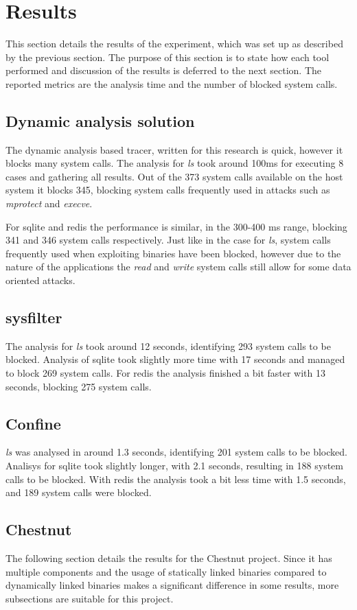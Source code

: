 \section{Results}
This section details the results of the experiment, which was set up as described by the previous section.
The purpose of this section is to state how each tool performed and discussion of the results is deferred to the next section.
The reported metrics are the analysis time and the number of blocked system calls.

\subsection {Dynamic analysis solution}
The dynamic analysis based tracer, written for this research is quick, however it blocks many system calls.
The analysis for \textit{ls} took around 100ms for executing 8 cases and gathering all results.
Out of the 373 system calls available on the host system it blocks 345, blocking system calls frequently used in attacks such as \textit{mprotect} and \textit{execve}.

For sqlite and redis the performance is similar, in the 300-400 ms range, blocking 341 and 346 system calls respectively. Just like in the case for \textit{ls}, system calls frequently used when exploiting binaries have been blocked, however due to the nature of the applications the \textit{read} and \textit{write} system calls still allow for some data oriented attacks.

\subsection {sysfilter}
The analysis for \textit{ls} took around 12 seconds, identifying 293 system calls to be blocked.
Analysis of sqlite took slightly more time with 17 seconds and managed to block 269 system calls.
For redis the analysis finished a bit faster with 13 seconds, blocking 275 system calls.

\subsection {Confine}
\textit{ls} was analysed in around 1.3 seconds, identifying 201 system calls to be blocked.
Analisys for sqlite took slightly longer, with 2.1 seconds, resulting in 188 system calls to be blocked.
With redis the analysis took a bit less time with 1.5 seconds, and 189 system calls were blocked.

\subsection {Chestnut}
The following section details the results for the Chestnut project.
Since it has multiple components and the usage of statically linked binaries compared to dynamically linked binaries makes a significant difference in some results, more subsections are suitable for this project.

